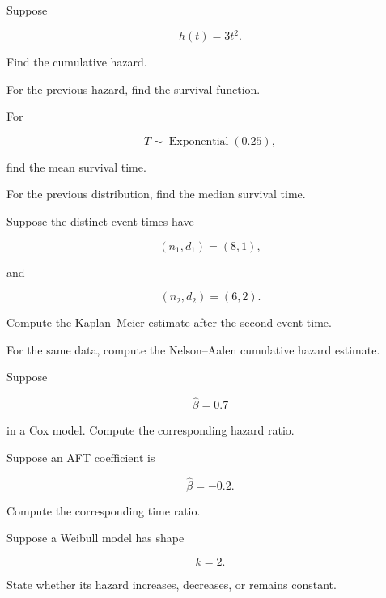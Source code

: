 \begin{exercise}[2]
Suppose

\[
h(t)=3t^2.
\]

Find the cumulative hazard.
\end{exercise}

\begin{exercise}[2]
For the previous hazard, find the survival function.
\end{exercise}

\begin{exercise}[2]
For

\[
T\sim\operatorname{Exponential}(0.25),
\]

find the mean survival time.
\end{exercise}

\begin{exercise}[2]
For the previous distribution, find the median survival time.
\end{exercise}

\begin{exercise}[2]
Suppose the distinct event times have

\[
(n_1,d_1)=(8,1),
\]

and

\[
(n_2,d_2)=(6,2).
\]

Compute the Kaplan--Meier estimate after the second event time.
\end{exercise}

\begin{exercise}[2]
For the same data, compute the Nelson--Aalen cumulative hazard estimate.
\end{exercise}

\begin{exercise}[2]
Suppose

\[
\widehat{\beta}=0.7
\]

in a Cox model. Compute the corresponding hazard ratio.
\end{exercise}

\begin{exercise}[2]
Suppose an AFT coefficient is

\[
\widehat{\beta}=-0.2.
\]

Compute the corresponding time ratio.
\end{exercise}

\begin{exercise}[2]
Suppose a Weibull model has shape

\[
k=2.
\]

State whether its hazard increases, decreases, or remains constant.
\end{exercise}


